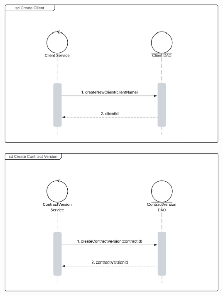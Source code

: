 \begin{figure}[H]
    \centering

    \begin{minipage}[t]{0.48\textwidth}
        \centering
        \includegraphics[width=\textwidth]{Images/Sequence Diagram - Create Client Ref.png}
        \label{fig:sequence_diagram_create_client}
    \end{minipage}
    \hfill
    \begin{minipage}[t]{0.48\textwidth}
        \centering
        \includegraphics[width=\textwidth]{Images/Sequence Diagram - Create Contract Version Ref.png}
        \label{fig:sequence_diagram_create_contract_version}
    \end{minipage}

    \vspace{0.5cm}


\end{figure}
